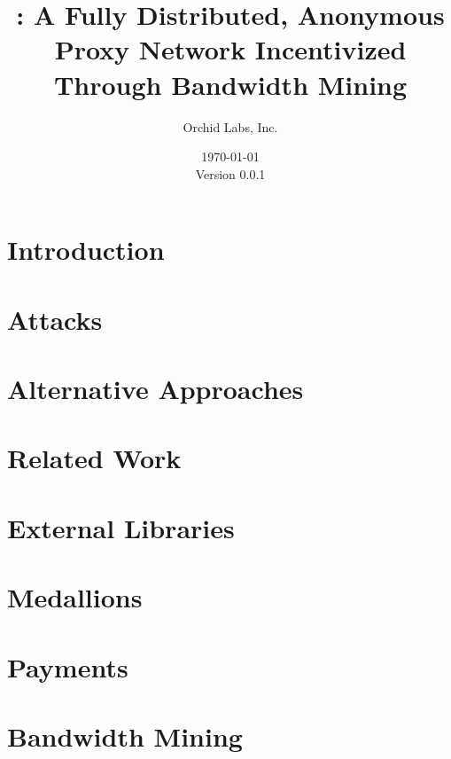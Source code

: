 \documentclass{article}
\title{\Orchid: A Fully Distributed, Anonymous Proxy Network Incentivized Through Bandwidth Mining}
\author{Orchid Labs, Inc.}
\date{\today{} \\ Version 0.0.1}
\begin{document}
\maketitle

\begin{abstract}

\end{abstract}

\newpage
\tableofcontents
\newpage

\section{Introduction}
\label{sec:overview}


\section{Attacks}
\label{sec:attacks}


\section{Alternative Approaches}
\label{sec:prior-work}


\section{Related Work}
\label{sec:related}


\section{External Libraries}
\label{sec:external-libraries}


\section{Medallions}
\label{medallions}


\section{Payments}
\label{sec:payments}


\section{Bandwidth Mining}
\label{sec:mining}

\end{document}
